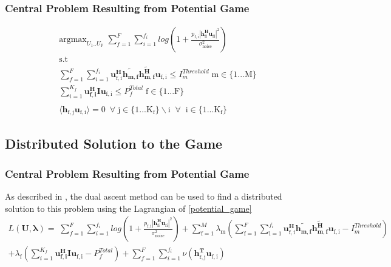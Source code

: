 \documentclass[12pt]{article}
\begin{document}
\subsubsection{Central Problem Resulting from Potential Game}

\begin{gather}\label{potential_game}
\mathrm{argmax}_{U_{\mathrm{1}}.. U_{\mathrm{F}}}
\;
\sum_{f=1}^F
\sum_{i=1}^{f_i}
log(1+\frac{p_{ \mathrm{f,i}}|\mathbf{h^H_{\mathrm{fi}}u_{ \mathrm{fi}}}|^2}{\sigma^2_{ \mathrm{noise}} })
\\
\mathrm{s.t}
\\
\sum_{f=1}^F
\sum_{i=1}^{f_i}
\mathbf{u_{ \mathrm{f,i}}^H} \mathbf{\tilde{h_{m,f}}} \mathbf{\tilde{h_{m,f}^H}} \mathbf{u_{\mathrm{f,i}}} \leq I^{Threshold}_{m} \;  \mathrm{m} \in  \mathrm{\{1 ... M\}}
\\
\sum_{i=1}^{K_f}\mathbf{u_{f,i}^H} \mathbf{I} \mathbf{u_{\mathrm{f,i}}} \leq  P^{Total}_{f}
\; \mathrm{f} \in \mathrm{\{1 ... F\}}
\\
\\
\langle \mathbf{h_{\mathrm{f,j}}}\mathbf{u_{\mathrm{f,i}}} \rangle =0\ \; \forall \; \mathrm{j \in \{1 ... K_f\}\backslash i \;\; 
}
\forall \;\;\mathrm{ i \in \{1 ... K_f\}}
\end{gather}



\subsection{Distributed Solution to the Game}
\subsubsection{Central Problem Resulting from Potential Game}
As described in \cite[p.8,9]{boyd2011distributed}, the dual ascent method can be used to find a distributed solution to this problem using the Lagrangian of \eqref{potential_game}
\\
\begin{multline}
L(\mathbf{U,\lambda}) = 
\;
\sum_{f=1}^F
\sum_{i=1}^{f_i}
log(1+\frac{p_{ \mathrm{f,i}}|\mathbf{h^H_{\mathrm{fi}}u_{ \mathrm{fi}}}|^2}{\sigma^2_{ \mathrm{noise}} })
+
\sum_{\mathrm{f=1}}^M \lambda_{\mathrm{m}}
(\sum_{\mathrm{f=1}}^F
\sum_{\mathrm{i=1}}^{f_i}
\mathbf{u_{ \mathrm{f,i}}^H} \mathbf{\tilde{h_{m,f}}} \mathbf{\tilde{h_{m,f}^H}} \mathbf{u_{\mathrm{f,i}}} - I^{Threshold}_{m} )
\\
+ 
\lambda_{\mathrm{f}}(
\sum_{i=1}^{K_f}\mathbf{u_{f,i}^H} \mathbf{I} \mathbf{u_{\mathrm{f,i}}} -  P^{Total}_{f})
+
\sum_{f=1}^F
\sum_{i=1}^{f_i}
\nu(\mathbf{h^T_{\mathrm{f,j}}}\mathbf{u_{\mathrm{f,i}}})
\end{multline}
\end{document}
